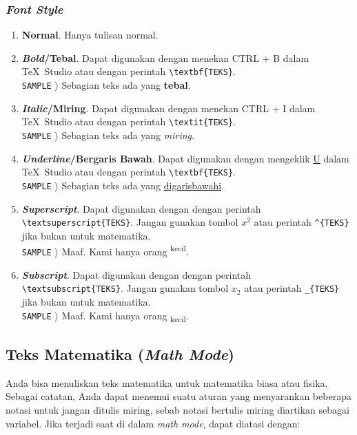\subsubsection{\textit{Font Style}}

\begin{enumerate}[label=\alph*.]
    \item \textbf{Normal}. Hanya tulisan normal.
    \item \textbf{\textit{Bold}/Tebal}. Dapat digunakan dengan menekan CTRL + B dalam \TeX\ Studio atau dengan perintah \verb|\textbf{TEKS}|. \\
    \texttt{SAMPLE} $\rangle$ Sebagian teks ada yang \textbf{tebal}.
    \item \textbf{\textit{Italic}/Miring}. Dapat digunakan dengan menekan CTRL + I dalam \TeX\ Studio atau dengan perintah \verb|\textit{TEKS}|. \\
    \texttt{SAMPLE} $\rangle$ Sebagian teks ada yang \textit{miring}.
    \item \textbf{\textit{Underline}/Bergaris Bawah}. Dapat digunakan dengan mengeklik \underline{U} dalam \TeX\ Studio atau dengan perintah \verb|\textbf{TEKS}|. \\
    \texttt{SAMPLE} $\rangle$ Sebagian teks ada yang \underline{digarisbawahi}.
    \item \textbf{\textit{Superscript}}. Dapat digunakan dengan dengan perintah \verb|\textsuperscript{TEKS}|. Jangan gunakan tombol $x^2$ atau perintah \verb|^{TEKS}| jika bukan untuk matematika. \\
    \texttt{SAMPLE} $\rangle$ Maaf. Kami hanya orang \textsuperscript{kecil}.
    \item \textbf{\textit{Subscript}}. Dapat digunakan dengan dengan perintah \verb|\textsubscript{TEKS}|. Jangan gunakan tombol $x_2$ atau perintah \verb|_{TEKS}| jika bukan untuk matematika. \\
    \texttt{SAMPLE} $\rangle$ Maaf. Kami hanya orang \textsubscript{kecil}.
\end{enumerate}

\subsection{Teks Matematika (\textit{Math Mode})}

Anda bisa menuliskan teks matematika untuk matematika biasa atau fisika. Sebagai catatan, Anda dapat menemui suatu aturan yang menyarankan beberapa notasi untuk jangan ditulis miring, sebab notasi bertulis miring diartikan sebagai variabel. Jika terjadi saat di dalam \textit{math mode}, dapat diatasi dengan:

